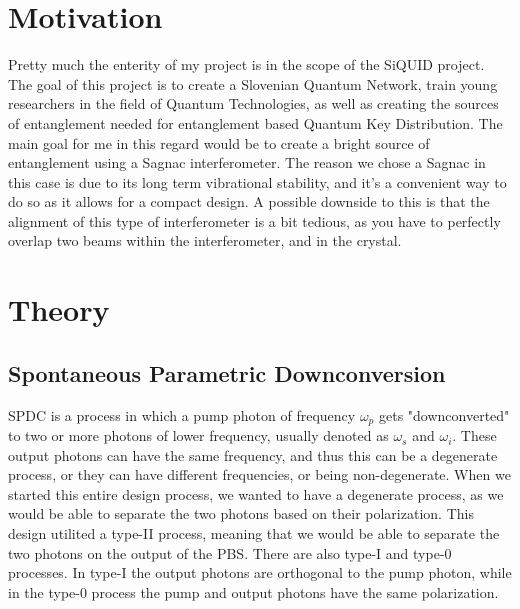 \documentclass{article}
\begin{document}
\section{Motivation}
Pretty much the enterity of my project is in the scope of the SiQUID project. The goal of this project is to create a Slovenian Quantum Network, train young researchers in the field of Quantum Technologies, as well as 
creating the sources of entanglement needed for entanglement based Quantum Key Distribution. The main goal for me in this regard would be to create a bright source of entanglement using a Sagnac interferometer. The reason we 
chose a Sagnac in this case is due to its long term vibrational stability, and it's a convenient way to do so as it allows for a compact design. A possible downside to this is that the alignment of this type of 
interferometer is a bit tedious, as you have to perfectly overlap two beams within the interferometer, and in the crystal.

\section{Theory}
\subsection{Spontaneous Parametric Downconversion}
SPDC is a process in which a pump photon of frequency $\omega_p$ gets "downconverted" to two or more photons of lower frequency,
usually denoted as $\omega_s$ and $\omega_i$. These output photons can have the same frequency,
and thus this can be a degenerate process, or they can have different frequencies, or being non-degenerate.
When we started this entire design process, we wanted to have a degenerate process, as we would be able to separate
the two photons based on their polarization. This design utilited a type-II process, meaning that we would be able 
to separate the two photons on the output of the PBS.
There are also type-I and type-0 processes. In type-I the output photons are orthogonal to the pump photon, while in the type-0 process the pump and output photons have the same polarization.
\end{document}
